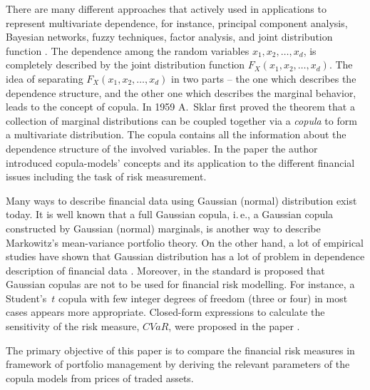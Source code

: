 \documentclass{llncs}
\begin{document}
There are many different approaches that actively used in applications to represent multivariate dependence, for instance, principal component analysis, Bayesian networks, fuzzy techniques, factor analysis, and joint distribution function \cite{Huynh2014, Kole2007}. The dependence among the random variables $x_1, x_2, \ldots, x_d$, is completely described by the joint distribution function $F_X(x_1, x_2, \ldots, x_d)$. The idea of separating $F_X(x_1, x_2, \ldots, x_d)$ in two parts -- the one which describes the dependence structure, and the other one which describes the marginal behavior, leads to the concept of copula.
%
%
In 1959 A.~Sklar \cite{Sklar1959}
first proved the theorem that a collection of marginal
distributions can be coupled together via a \textit{copula} to form a
multivariate distribution. The copula contains all the information
about the dependence structure of the involved variables. In the paper \cite{Penikas2010} the author introduced copula-models' concepts and its application to the different financial issues including the task of risk measurement.

Many ways to describe financial data using Gaussian (normal) distribution exist today. It is well known \cite{Xu2008} that a full Gaussian copula, i.\,e., a Gaussian copula constructed by Gaussian (normal) marginals,
is another way to describe Markowitz's mean-variance portfolio
theory. On the other hand, a lot of empirical studies have shown that Gaussian distribution has a lot of problem in dependence description of financial data \cite{Rachev2005, Limp2011, Wilmott2007}. Moreover, in the standard \cite{EBA2015} is proposed that Gaussian copulas are not to be used for financial risk modelling. For instance, a Student's~$t$ copula with few integer degrees of freedom (three or four) in most cases appears more appropriate.
%
Closed-form expressions to calculate the sensitivity of the risk measure, $CVaR$, were proposed in the paper \cite{Stoyanov2013}.

The primary objective of this paper is to compare the financial risk measures in framework of portfolio management by deriving the relevant parameters of the copula models from prices of traded assets.


\end{document}
